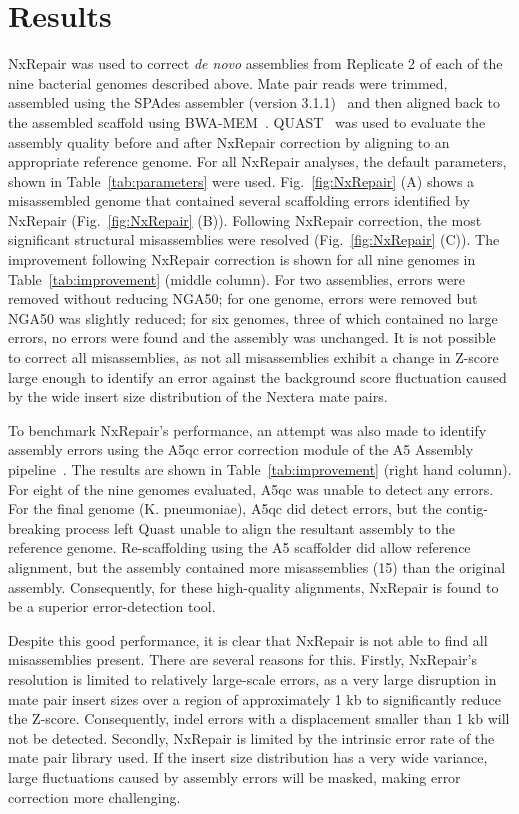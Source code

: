 \section{Results}
NxRepair was used to correct \textit{de novo} assemblies from Replicate 2 of each of the nine bacterial genomes described above. Mate pair reads were trimmed, assembled using the SPAdes assembler (version 3.1.1)~\cite{Bankevich2012} and then aligned back to the assembled scaffold using BWA-MEM~\cite{li2013}. QUAST~\cite{Gurevich2013} was used to evaluate the assembly quality before and after NxRepair correction by aligning to an appropriate reference genome. For all NxRepair analyses, the default parameters, shown in Table~\ref{tab:parameters} were used. Fig.~\ref{fig:NxRepair} (A) shows a misassembled genome that contained several scaffolding errors identified by NxRepair (Fig.~\ref{fig:NxRepair} (B)). Following NxRepair correction, the most significant structural misassemblies were resolved (Fig.~\ref{fig:NxRepair} (C)). The improvement following NxRepair correction is shown for all nine genomes in Table~\ref{tab:improvement} (middle column). For two assemblies, errors were removed without reducing NGA50; for one genome, errors were removed but NGA50 was slightly reduced; for six genomes, three of which contained no large errors, no errors were found and the assembly was unchanged. It is not possible to correct all misassemblies, as not all misassemblies exhibit a change in Z-score large enough to identify an error against the background score fluctuation caused by the wide insert size distribution of the Nextera mate pairs. 

To benchmark NxRepair's performance, an attempt was also made to identify assembly errors using the A5qc error correction module of the A5 Assembly pipeline~\cite{tritt2012}. The results are shown in Table~\ref{tab:improvement} (right hand column). For eight of the nine genomes evaluated, A5qc was unable to detect any errors. For the final genome (K. pneumoniae), A5qc did detect errors, but the contig-breaking process left Quast unable to align the resultant assembly to the reference genome. Re-scaffolding using the A5 scaffolder did allow reference alignment, but the assembly contained more misassemblies (15) than the original assembly. Consequently, for these high-quality alignments, NxRepair is found to be a superior error-detection tool. 

Despite this good performance, it is clear that NxRepair is not able to find all misassemblies present. There are several reasons for this. Firstly, NxRepair's resolution is limited to relatively large-scale errors, as a very large disruption in mate pair insert sizes over a region of approximately 1 kb to significantly reduce the Z-score. Consequently, indel errors with a displacement smaller than 1 kb will not be detected. Secondly, NxRepair is limited by the intrinsic error rate of the mate pair library used. If the insert size distribution has a very wide variance, large fluctuations caused by assembly errors will be masked, making error correction more challenging. 

